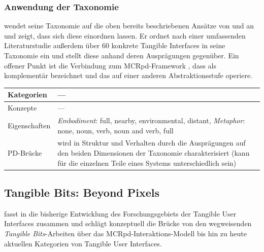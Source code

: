 \subsubsection{Anwendung der Taxonomie}
\citeauthor{Fishkin04} wendet seine Taxonomie auf die oben bereits beschriebenen Ansätze von \citep{Holmquist99} und \citep{Underkoffler99} an und zeigt, dass sich diese einordnen lassen. Er ordnet nach einer umfassenden Literaturstudie außerdem über 60 konkrete Tangible Interfaces in seine Taxonomie ein und stellt diese anhand deren Ausprägungen gegenüber. Ein offener Punkt ist die Verbindung zum \gls{MCRpd}-Framework \citep{Ullmer00}, dass \citeauthor{Fishkin04} als komplementär bezeichnet und das auf einer anderen Abstraktionsstufe operiere. 

\begin{tabular}{| p{3cm} | p{10cm} |}
  \hline
  Kategorien & --- \\ \hline
  Konzepte & --- \\ \hline
  Eigenschaften & \emph{Embodiment}: full, nearby, environmental, distant, \emph{Metaphor}: none, noun, verb, noun and verb, full\\ \hline
  PD-Brücke & wird in Struktur und Verhalten durch die Ausprägungen auf den beiden Dimensionen der Taxonomie charakterisiert (kann für die einzelnen Teile eines Systems unterschiedlich sein)  \\ \hline
\end{tabular} 


\subsection{Tangible Bits: Beyond Pixels} %
\label{sub:tangible_bits_beyond_pixels}

\citeauthor{Ishii08} fasst in \citep{Ishii08} die bisherige Entwicklung des Forschungsgebiets der Tangible User Interfaces zusammen und schlägt konzeptuell die Brücke von den wegweisenden \emph{Tangible Bits}-Arbeiten über das MCRpd-Interaktions-Modell bis hin zu heute aktuellen Kategorien von Tangible User Interfaces.

